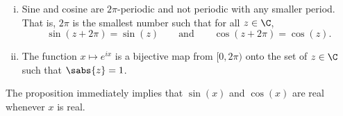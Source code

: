 \begin{prop}
\begin{enumerate}[(i)]
For all $z \in \C$, 
\begin{equation*}
e^{2\pi i} = 1 \qquad \text{and} \qquad e^{z + i 2\pi} = e^z.
\end{equation*}
\item
Sine and cosine are $2\pi$-periodic and not periodic with any smaller
period.  That is, $2\pi$ is the smallest number such that for all $z \in \C$,
\begin{equation*}
\sin(z+2\pi) = \sin(z)
\qquad \text{and} \qquad
\cos(z+2\pi) = \cos(z) .
\end{equation*}
\item
The function $x \mapsto e^{ix}$ is a bijective map from $[0,2\pi)$
onto the set of $z \in \C$ such that $\sabs{z} = 1$.
\end{enumerate}
\end{prop}

The proposition immediately implies that $\sin(x)$ and $\cos(x)$ are 
real whenever $x$ is real.

